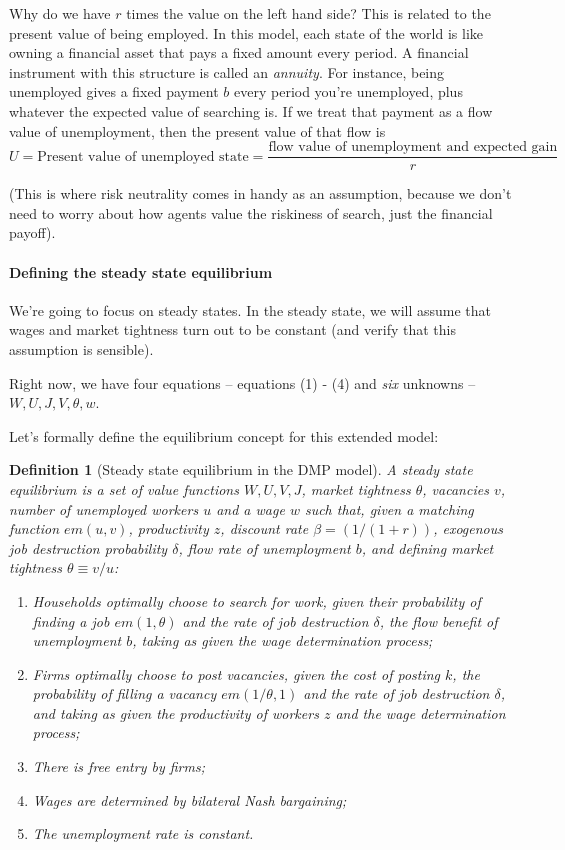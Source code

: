 \documentclass[12pt]{article}
\newtheorem*{Definition}{Definition}
\begin{document}
Why do we have $r$ times the value on the left hand side? This is related to the present value of being employed.   In this model, each state of the world is like owning a financial asset that pays a fixed amount every period.  A financial instrument with this structure is called an \textit{annuity}.  For instance, being unemployed gives a fixed payment $b$ every period you're unemployed, plus whatever the expected value of searching is.  If we treat that payment as a flow value of unemployment, then the present value of that flow is $$U = \text{Present value of unemployed state} = \frac{\text{flow value of unemployment and expected gain}}{r}$$ 

(This is where risk neutrality comes in handy as an assumption, because we don't need to worry about how agents value the riskiness of search, just the financial payoff).

\paragraph{Defining the steady state equilibrium} We're going to focus on steady states.  In the steady state, we will assume that wages and market tightness turn out to be constant (and verify that this assumption is sensible).

Right now, we have four equations -- equations (1) - (4) and \textit{six} unknowns -- $W,U, J, V, \theta, w$.%

Let's formally define the equilibrium concept for this extended model:

\begin{Definition}[Steady state equilibrium in the DMP model]
	A steady state equilibrium is a set of value functions $W,U,V,J$, market tightness $\theta$, vacancies $v$, number of unemployed workers $u$ and a wage $w $ such that, given a matching function $em(u,v)$, productivity $z$, discount rate $\beta = (1/(1+r))$, exogenous job destruction probability $\delta$, flow rate of unemployment $b$, and defining market tightness $\theta \equiv v/u$:
	\begin{enumerate}
		\item Households optimally choose to search for work, given their probability of finding a job $em(1,\theta)$ and the rate of job destruction $\delta$, the flow benefit of unemployment $b$, taking as given the wage determination process;
		\item Firms optimally choose to post vacancies, given the cost of posting $k$, the probability of filling a vacancy $em(1/\theta,1)$ and the rate of job destruction $\delta$, and taking as given the productivity of workers $z$ and the wage determination process;
		\item There is free entry by firms;
		\item Wages are determined by bilateral Nash bargaining;
		\item The unemployment rate is constant.
	\end{enumerate}

\end{Definition}
\end{document}
